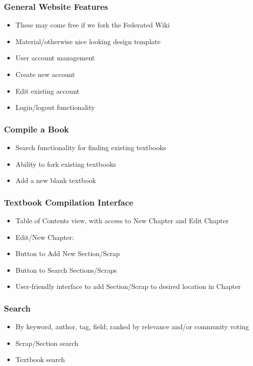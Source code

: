 \documentclass[letterpaper, 10pt, draftclsnofoot, compsoc, onecolumn]{IEEEtran}
\begin{document}
{{\subsubsection[System feature 1: General Website Features]{\rmfamily\bfseries\color{black} General Website Features}

\begin{itemize}
\item These may come free if we fork the Federated Wiki
\item Material/otherwise nice looking design template
\item User account management
\item Create new account
\item Edit existing account
\item Login/logout functionality
\end{itemize}

\subsubsection[System feature 2: Compile a book]{\rmfamily\bfseries\color{black} Compile a Book}
\begin{itemize}
\item Search functionality for finding existing textbooks
\item Ability to fork existing textbooks
\item Add a new blank textbook
\end{itemize}

\subsubsection[System feature 3: Textbook Compilation Interface]{\rmfamily\bfseries\color{black} Textbook Compilation Interface}
\begin{itemize}
\item Table of Contents view, with access to New Chapter and Edit Chapter
\item Edit/New Chapter:
\item Button to Add New Section/Scrap
\item Button to Search Sections/Scraps
\item User-friendly interface to add Section/Scrap to desired location in Chapter
\end{itemize}

\subsubsection[System feature 4: Search Feature]{\rmfamily\bfseries\color{black} Search}
\begin{itemize}
\item By keyword, author, tag, field; ranked by relevance and/or community voting
\item Scrap/Section search
\item Textbook search
\end{itemize}

}}
\end{document}
